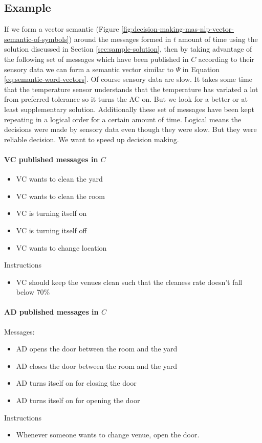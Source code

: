 \documentclass{article}
\begin{document}
\begin{multicols}{2}
		\subsection{Example}\label{sec:sample-solution-example} 
			If we form a vector semantic (Figure \ref{fig:decision-making-mas-nlp-vector-semantic-of-symbols}) around the messages formed in $t$ amount of time using the solution discussed in Section \ref{sec:sample-solution}, then by taking advantage of the following set of messages which have been published in $C$ according to their sensory data we can form a semantic vector similar to $\Psi$ in Equation \ref{eq:semantic-word-vectors}. Of course sensory data are slow. It takes some time that the temperature sensor understands that the temperature has variated a lot from preferred tolerance so it turns the AC on. But we look for a better or at least supplementary solution. Additionally these set of messages have been kept repeating in a logical order for a certain amount of time. Logical means the decisions were made by sensory data even though they were slow. But they were reliable decision. We want to speed up decision making.    
			\paragraph{VC published messages in $C$}
				\begin{itemize}
					\item VC wants to clean the yard
					\item VC wants to clean the room
					\item VC is turning itself on
					\item VC is turning itself off
					\item VC wants to change location
				\end{itemize}
				Instructions
				\begin{itemize}
					\item VC should keep the venues clean such that the cleaness rate doesn't fall below 70\% 
				\end{itemize}
			\paragraph{AD published messages in $C$}
				Messages:
				\begin{itemize}
					\item AD opens the door between the room and the yard
					\item AD closes the door between the room and the yard
					\item AD turns itself on for closing the door
					\item AD turns itself on for opening the door
				\end{itemize}
				Instructions
				\begin{itemize}
					\item Whenever someone wants to change venue, open the door.
				\end{itemize}

\end{multicols}
\end{document}

